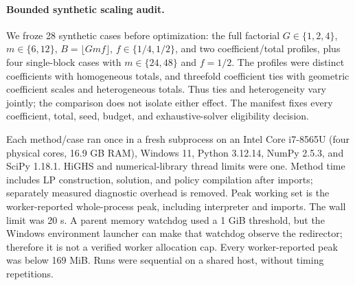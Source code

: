\paragraph{Bounded synthetic scaling audit.}

We froze 28 synthetic cases before optimization: the full factorial $G\in\{1,2,4\}$, $m\in\{6,12\}$, $B=\lfloor Gmf\rfloor$, $f\in\{1/4,1/2\}$, and two coefficient/total profiles, plus four single-block cases with $m\in\{24,48\}$ and $f=1/2$. The profiles were distinct coefficients with homogeneous totals, and threefold coefficient ties with geometric coefficient scales and heterogeneous totals. Thus ties and heterogeneity vary jointly; the comparison does not isolate either effect. The manifest fixes every coefficient, total, seed, budget, and exhaustive-solver eligibility decision.

Each method/case ran once in a fresh subprocess on an Intel Core i7-8565U (four physical cores, 16.9 GB RAM), Windows 11, Python 3.12.14, NumPy 2.5.3, and SciPy 1.18.1. HiGHS and numerical-library thread limits were one. Method time includes LP construction, solution, and policy compilation after imports; separately measured diagnostic overhead is removed. Peak working set is the worker-reported whole-process peak, including interpreter and imports. The wall limit was 20 s. A parent memory watchdog used a 1 GiB threshold, but the Windows environment launcher can make that watchdog observe the redirector; therefore it is not a verified worker allocation cap. Every worker-reported peak was below 169 MiB. Runs were sequential on a shared host, without timing repetitions.

